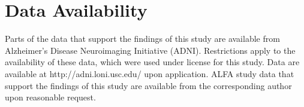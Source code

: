 \section*{Data Availability}

Parts of the data that support the findings of this study are available from Alzheimer’s Disease Neuroimaging Initiative (ADNI). Restrictions apply to the availability of these data, which were used under license for this study. Data are available at http://adni.loni.usc.edu/ upon application. ALFA study data that support the findings of this study are available from the corresponding author upon reasonable request. 

